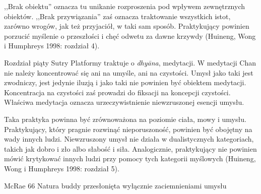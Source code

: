 ,,Brak obiektu'' oznacza tu unikanie rozproszenia pod wpływem zewnętrznych obiektów. ,,Brak przywiązania'' zaś oznacza traktowanie wszystkich istot, zarówno wrogów, jak też przyjaciół, w taki sam sposób. Praktykujący powinien porzucić myślenie o przeszłości i chęć odwetu za dawne krzywdy (Huineng, Wong i Humphreys 1998: rozdział 4).

Rozdział piąty Sutry Platformy traktuje o \textit{dhyāna}, medytacji. W medytacji Chan nie należy koncentrować się ani na umyśle, ani na czystości. Umysł jako taki jest zwodniczy, jest jedynie iluzją i jako taki nie powinien być obiektem medytacji. Koncentracja na czystości zaś prowadzi do fiksacji na koncepcji czystości. Właściwa medytacja oznacza urzeczywistnienie niewzruszonej esencji umysłu.

Taka praktyka powinna być zrównoważona na poziomie ciała, mowy i umysłu. Praktykujący, który pragnie rozwinąć nieporuszoność, powinien być obojętny na wady innych ludzi. Niewzruszony umysł nie działa w dualistycznych kategoriach, takich jak dobro i zło albo słabość i siła. Analogicznie, praktykujący nie powinien mówić krytykować innych ludzi przy pomocy tych kategorii myślowych (Huineng, Wong i Humphreys 1998: rozdział 5).

McRae 66
Natura buddy przesłonięta wyłącznie zaciemnieniami umysłu
\fi
